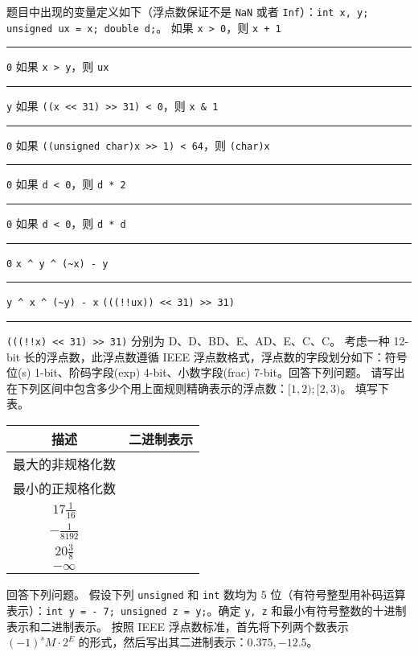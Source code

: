 \begin{problems}
		题目中出现的变量定义如下（浮点数保证不是 \texttt{NaN} 或者 \texttt{Inf}）：\texttt{int x, y; unsigned ux = x; double d;}。
		\qn 如果 \texttt{x > 0}，则 \texttt{x + 1} \rule{2.5cm}{0.25mm} \texttt{0}
		\qn 如果 \texttt{x > y}，则 \texttt{ux} \rule{2.5cm}{0.25mm} \texttt{y}
		\qn 如果 \verb|((x << 31) >> 31) < 0|，则 \verb|x & 1| \rule{2.5cm}{0.25mm} \texttt{0}
		\qn 如果 \verb|((unsigned char)x >> 1) < 64|，则 \texttt{(char)x} \rule{2.5cm}{0.25mm} \texttt{0}
		\qn 如果 \texttt{d < 0}，则 \texttt{d * 2} \rule{2.5cm}{0.25mm} \texttt{0}
		\qn 如果 \texttt{d < 0}，则 \texttt{d * d} \rule{2.5cm}{0.25mm} \texttt{0}
		\qn \verb|x ^ y ^ (~x) - y| \rule{2.5cm}{0.25mm} \verb|y ^ x ^ (~y) - x|
		\qn \verb|(((!!ux)) << 31) >> 31)| \rule{2.5cm}{0.25mm} \verb|(((!!x) << 31) >> 31)|
		\sol 分别为 D、D、BD、E、AD、E、C、C。
		 考虑一种 12-bit 长的浮点数，此浮点数遵循 IEEE 浮点数格式，浮点数的字段划分如下：符号位(s) 1-bit、阶码字段(exp) 4-bit、小数字段(frac) 7-bit。回答下列问题。
			\qn 请写出在下列区间中包含多少个用上面规则精确表示的浮点数：$[1, 2); [2, 3)$。
			\qn 填写下表。
			\begin{table}[H]
				\centering
				\begin{tabular}{|c|c|}
					\hline
					描述 & 二进制表示 \\ \hline
					最大的非规格化数 & {\qquad \qquad \qquad \qquad} \\ \hline
					最小的正规格化数 & {\qquad \qquad \qquad \qquad} \\ \hline
					$17 \frac{1}{16}$ & {\qquad \qquad \qquad \qquad} \\ \hline
					$-\frac{1}{8192}$ & {\qquad \qquad \qquad \qquad} \\ \hline
					$20 \frac{3}{8}$ & {\qquad \qquad \qquad \qquad} \\ \hline
					$-\infty$ & {\qquad \qquad \qquad \qquad} \\ \hline
				\end{tabular}
			\end{table}
		 回答下列问题。
			\qn 假设下列 \texttt{unsigned} 和 \texttt{int} 数均为 5 位（有符号整型用补码运算表示）：\texttt{int y = - 7; unsigned z = y;}。确定 \texttt{y, z} 和最小有符号整数的十进制表示和二进制表示。
			\qn 按照 IEEE 浮点数标准，首先将下列两个数表示 $(-1)^sM \cdot 2^E$ 的形式，然后写出其二进制表示：$0.375, -12.5$。
	\end{problems}